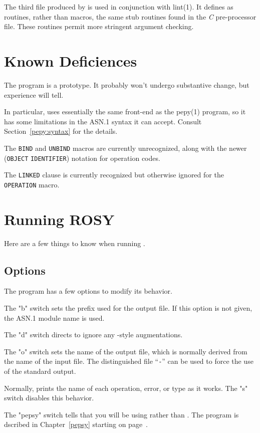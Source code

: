 The third file produced by  is used in conjunction with \man lint(1).
It defines as routines, rather than macros, the same stub routines found in
the {\em C\/} pre-processor file.
These routines permit more stringent argument checking.

\section	{Known Deficiences}\label{rosy:deficiencies}
The  program is a prototype.
It probably won't undergo substantive change,
but experience will tell.

In particular,
 uses essentially the same front-end as the \man pepy(1) program,
so it has some limitations in the ASN.1 syntax it can accept.
Consult Section~\ref{pepy:syntax} for the details.

The \verb"BIND" and \verb"UNBIND" macros are currently unrecognized,
along with the newer (\verb"OBJECT" \verb"IDENTIFIER") notation for operation
codes.

The \verb"LINKED" clause is currently recognized but otherwise ignored
for the \verb"OPERATION" macro.

\section	{Running ROSY}
Here are a few things to know when running .

\subsection	{Options}
The  program has a few options to modify its behavior.

The \switch"b" switch sets the prefix used for the output file.
If this option is not given,
the ASN.1 module name is used.

The \switch"d" switch directs  to ignore any -style
augmentations.

The \switch"o" switch sets the name of the output file,
which is normally derived from the name of the input file.
The distinguished file ``\verb"-"'' can be used to force the use of the
standard output.

Normally,  prints the name of each operation, error, or type
as it works.
The \switch"s" switch disables this behavior.

The \switch"pepsy" switch tells  that you will be using
 rather than .
The  program is dscribed in Chapter~\ref{pepsy} starting on 
page~\pageref{pepsy}.

